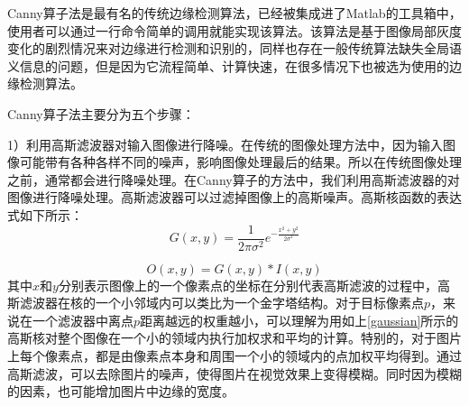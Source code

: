 \documentclass[master]{thesis-uestc}
\begin{document}
Canny算子法是最有名的传统边缘检测算法，已经被集成进了Matlab的工具箱中，使用者可以通过一行命令简单的调用就能实现该算法。该算法是基于图像局部灰度变化的剧烈情况来对边缘进行检测和识别的，同样也存在一般传统算法缺失全局语义信息的问题，但是因为它流程简单、计算快速，在很多情况下也被选为使用的边缘检测算法。

Canny算子法主要分为五个步骤：

1）利用高斯滤波器对输入图像进行降噪。在传统的图像处理方法中，因为输入图像可能带有各种各样不同的噪声，影响图像处理最后的结果。所以在传统图像处理之前，通常都会进行降噪处理。在Canny算子的方法中，我们利用高斯滤波器的对图像进行降噪处理。高斯滤波器可以过滤掉图像上的高斯噪声。高斯核函数的表达式如下所示：
\begin{equation}
    \label{gaussian}
    G(x, y) = \frac{1}{2  \pi \sigma ^ 2}e^{- \frac{x^2 + y^2}{2\sigma^2}}
\end{equation}

\begin{equation}
    O(x, y) = G(x, y)* I(x, y)
\end{equation}
其中$x$和$y$分别表示图像上的一个像素点的坐标在分别代表高斯滤波的过程中，高斯滤波器在核的一个小邻域内可以类比为一个金字塔结构。对于目标像素点$p$，来说在一个滤波器中离点$p$距离越远的权重越小，可以理解为用如上\ref{gaussian}所示的高斯核对整个图像在一个小的领域内执行加权求和平均的计算。特别的，对于图片上每个像素点，都是由像素点本身和周围一个小的领域内的点加权平均得到。通过高斯滤波，可以去除图片的噪声，使得图片在视觉效果上变得模糊。同时因为模糊的因素，也可能增加图片中边缘的宽度。
\end{document}
